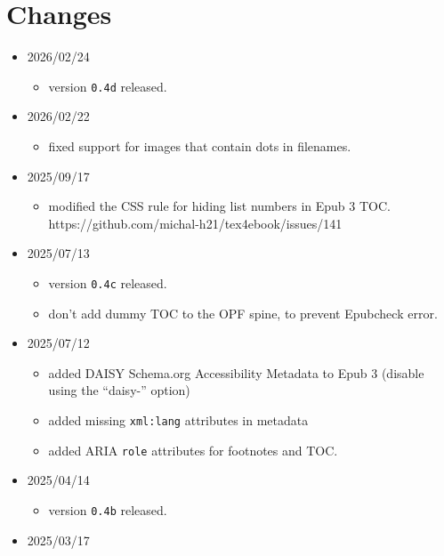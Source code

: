 \section{Changes}\label{changes}

\begin{itemize}
\item
  2026/02/24

  \begin{itemize}
  \tightlist
  \item
    version \texttt{0.4d} released.
  \end{itemize}
\item
  2026/02/22

  \begin{itemize}
  \tightlist
  \item
    fixed support for images that contain dots in filenames.
  \end{itemize}
\item
  2025/09/17

  \begin{itemize}
  \tightlist
  \item
    modified the CSS rule for hiding list numbers in Epub 3 TOC.
    https://github.com/michal-h21/tex4ebook/issues/141
  \end{itemize}
\item
  2025/07/13

  \begin{itemize}
  \tightlist
  \item
    version \texttt{0.4c} released.
  \item
    don't add dummy TOC to the OPF spine, to prevent Epubcheck error.
  \end{itemize}
\item
  2025/07/12

  \begin{itemize}
  \tightlist
  \item
    added DAISY Schema.org Accessibility Metadata to Epub 3 (disable
    using the ``daisy-'' option)
  \item
    added missing \texttt{xml:lang} attributes in metadata
  \item
    added ARIA \texttt{role} attributes for footnotes and TOC.
  \end{itemize}
\item
  2025/04/14

  \begin{itemize}
  \tightlist
  \item
    version \texttt{0.4b} released.
  \end{itemize}
\item
  2025/03/17


\end{itemize}
